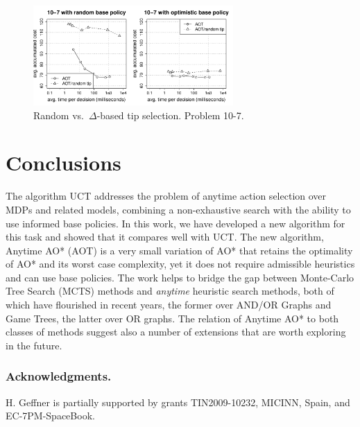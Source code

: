 \documentclass[letterpaper]{article}
\newcommand{\Omit}[1]{}
\begin{document}
\begin{figure}
\centering
\includegraphics[width=3in,clip=on,trim=.75cm 1cm 1.5cm 1cm]{ctp_selection_10-7.pdf}
\caption{Random vs.\ $\Delta$-based tip selection. Problem 10-7.}
\label{fig:ctp:selection:10-7}
\end{figure}




\section{Conclusions}

The algorithm UCT addresses the problem of anytime action selection over MDPs and related models,
combining a  non-exhaustive search with the ability to  use informed base policies.
In this work, we  have developed a new  algorithm for this task and showed that it compares well with UCT. The new algorithm, Anytime AO* (AOT)
is a very small variation of AO* that retains the optimality of AO* and its worst case  complexity,
yet it does not require  admissible heuristics and can use base policies. The work
 helps to  bridge the gap between  Monte-Carlo Tree Search (MCTS) methods and \emph{anytime} heuristic search methods,
both of which have flourished in recent years, the former over AND/OR Graphs and Game Trees, the latter
over OR graphs. The relation of Anytime AO* to both classes of methods  suggest also
a number of extensions that are worth exploring in the future.

\Omit{
 MCTS methods suggest the use of alternative leaf expansion
strategies for problems with very large branching factors; anytime heuristic search methods
suggest  the use of labels and upper bounds for pruning the search,
the decomposition of the value function  in the form $g+h$ typical of A* \cite{chakrabarti:g+h,hansen:lao},
and the use of a heuristic multiplier parameter $W > 1$ possibly adjustable \cite{richter:w,thayer-ruml:anytime}
for speeding up the search for the goal and subsequent pruning.}


\subsubsection{Acknowledgments.}
H. Geffner is partially supported by grants
TIN2009-10232, MICINN, Spain, and EC-7PM-SpaceBook.
\end{document}
